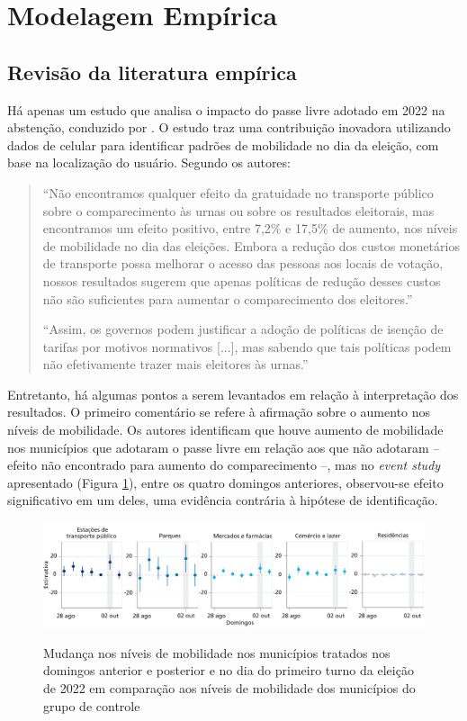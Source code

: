 \section{Modelagem Empírica}
\label{sec_modEmp}

\subsection{Revisão da literatura empírica}
\label{subsec_revisao}

Há apenas um estudo que analisa o impacto do passe livre adotado em 2022 na abstenção, conduzido por \cite{pereira2023transporte}. O estudo traz uma contribuição inovadora utilizando dados de celular para identificar padrões de mobilidade no dia da eleição, com base na localização do usuário. Segundo os autores:

\begin{quote}
    ``Não encontramos qualquer efeito da gratuidade no transporte público sobre
    o comparecimento às urnas ou sobre os resultados eleitorais, mas encontramos um efeito positivo,
    entre 7,2\% e 17,5\% de aumento, nos níveis de mobilidade no dia das eleições. Embora a redução
    dos custos monetários de transporte possa melhorar o acesso das pessoas aos locais de votação,
    nossos resultados sugerem que apenas políticas de redução desses custos não são suficientes
    para aumentar o comparecimento dos eleitores.'' 

    ``Assim, os governos podem justificar a adoção de políticas de isenção de tarifas por motivos normativos [...], mas sabendo que tais políticas podem não efetivamente trazer mais eleitores às urnas.''
\end{quote}

Entretanto, há algumas pontos a serem levantados em relação à interpretação dos resultados. O primeiro comentário se refere à afirmação sobre o aumento nos níveis de mobilidade. Os autores identificam que houve aumento de mobilidade nos municípios que adotaram o passe livre em relação aos que não adotaram -- efeito não encontrado para aumento do comparecimento --, mas no \textit{event study} apresentado (Figura \ref{fig_pereira_mob}), entre os quatro domingos anteriores, observou-se efeito significativo em um deles, uma evidência contrária à hipótese de identificação.

\begin{figure}[!ht]
  \caption{Mudança nos níveis de mobilidade nos municípios tratados nos domingos anterior e posterior e no dia do primeiro turno da eleição de 2022 em comparação aos níveis de mobilidade dos municípios do grupo de controle}
    \includegraphics[width = \linewidth]{relatorios/passe-livre/graficos/pereira_mob.png}
    \label{fig_pereira_mob}
\end{figure}

